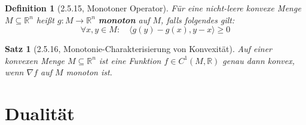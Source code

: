 \documentclass[12pt]{extreport} %
\newcommand{\R}{\mathbb{R}}
\theoremstyle{named}
\theoremstyle{nnamed}
\theoremstyle{itshape}
\newtheorem*{satz}{Satz}
\newtheorem*{definition}{Definition}
\theoremstyle{normal}
\begin{document}
\begin{definition}[2.5.15, Monotoner Operator]
	Für eine nicht-leere konvexe Menge $M \subseteq \R^n$ heißt $g \colon M \rightarrow \R^n$ \textbf{monoton} auf $M$, falls folgendes gilt:
	$$ \forall x,y \in M: \quad \langle g(y) - g(x), y - x \rangle \geq 0 $$
\end{definition}

\begin{satz}[2.5.16, Monotonie-Charakterisierung von Konvexität]
	Auf einer konvexen Menge $M \subseteq \R^n$ ist eine Funktion $f \in C^1(M, \R)$ genau dann konvex, wenn $\nabla f$ auf $M$ monoton ist.	
\end{satz}

\section{Dualität}

\end{document}
